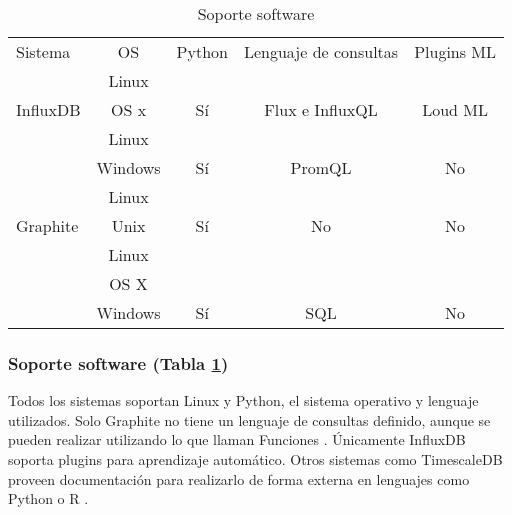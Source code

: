 \begin{table}[H]
    \begin{center}
        \begin{adjustbox}{max width=\textwidth}
            \begin{tabular}{l c c c c}
                \toprule
                Sistema & OS & Python & Lenguaje de consultas & Plugins ML\\
                \otoprule
                & Linux &                       &  \\
                \multirow{-2}{*}{InfluxDB} & OS x  & \multirow{-2}{*}{Sí} & \multirow{-2}{*}{Flux e InfluxQL} & \multirow{-2}{*}{Loud ML} \\
                \rowcolor{gray!35}
                                            & Linux   &                        & & \\
                \rowcolor{gray!35}
                \multirow{-2}{*}{Prometheus} & Windows & \multirow{-2}{*}{Sí}  & \multirow{-2}{*}{PromQL} & \multirow{-2}{*}{No}\\
                                        & Linux &                       &  & \\
                \multirow{-2}{*}{Graphite} & Unix  & \multirow{-2}{*}{Sí}  & \multirow{-2}{*}{No} & \multirow{-2}{*}{No} \\
                \rowcolor{gray!35}
                                            & Linux   &                             & & \\
                \rowcolor{gray!35}
                                            & OS X    &                             & & \\
                \rowcolor{gray!35}
                \multirow{-3}{*}{TimescaleDB} & Windows & \multirow{-3}{*}{Sí} & \multirow{-3}{*}{SQL} & \multirow{-3}{*}{No} \\
                \bottomrule
            \end{tabular}
        \end{adjustbox}
        \caption{Soporte software}
        \label{tabla:sssgbd}
    \end{center}
\end{table}

\subsubsection{Soporte software (Tabla \ref{tabla:sssgbd})} Todos los sistemas soportan Linux y Python, el sistema operativo 
y lenguaje utilizados. Solo Graphite no tiene un lenguaje de consultas definido, aunque se pueden realizar utilizando lo que 
llaman Funciones \cite{graphite-functions}. Únicamente InfluxDB soporta plugins para aprendizaje automático. Otros sistemas como
TimescaleDB proveen documentación para realizarlo de forma externa en lenguajes como Python o R \cite{timescale-forecasting}.

